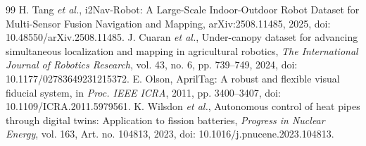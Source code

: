 \documentclass[journal,onecolumn]{IEEEtran}
\begin{document}
\begin{thebibliography}{99}
 H. Tang \emph{et al.}, i2Nav-Robot: A Large-Scale Indoor-Outdoor Robot Dataset for Multi-Sensor Fusion Navigation and Mapping, arXiv:2508.11485, 2025, doi: 10.48550/arXiv.2508.11485.
 J. Cuaran \emph{et al.}, Under-canopy dataset for advancing simultaneous localization and mapping in agricultural robotics, \emph{The International Journal of Robotics Research}, vol. 43, no. 6, pp. 739--749, 2024, doi: 10.1177/02783649231215372.
 E. Olson, AprilTag: A robust and flexible visual fiducial system, in \emph{Proc. IEEE ICRA}, 2011, pp. 3400--3407, doi: 10.1109/ICRA.2011.5979561.
 K. Wilsdon \emph{et al.}, Autonomous control of heat pipes through digital twins: Application to fission batteries, \emph{Progress in Nuclear Energy}, vol. 163, Art. no. 104813, 2023, doi: 10.1016/j.pnucene.2023.104813.
\end{thebibliography}
\end{document}
